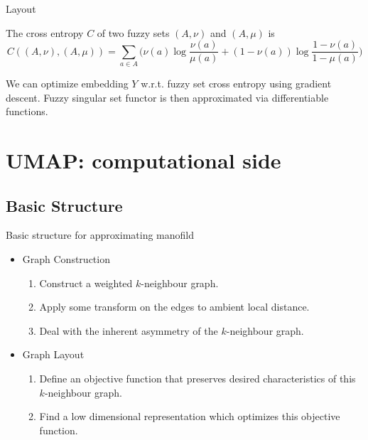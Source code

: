 \documentclass{beamer}
\theoremstyle{named}
\begin{document}
\begin{frame}{Layout}
	\begin{definition}
		The cross entropy $C$ of two fuzzy sets $(A,\nu)$ and $(A, \mu)$ is
		\[
			C((A,\nu), (A, \mu)) = \sum\limits_{a \in A} \big( \nu(a) \log \frac{\nu(a)}{\mu(a)} + (1 - \nu(a)) \log \frac{1 - \nu(a)}{1 - \mu(a)} \big)
		\]
	\end{definition}
We can optimize embedding $Y$ w.r.t. fuzzy set cross entropy using gradient descent. Fuzzy singular set functor is then approximated via differentiable functions.
\end{frame}

\iffalse
\begin{frame}{Layout}
	So the algorithm is next:
	\begin{enumerate}
		\item Construct fuzzy simplicial set
		\item Optimize the layout of data in low dim. space minimizing the error between topological representations
	\end{enumerate}
\end{frame}
\fi

\section{UMAP: computational side}

\subsection{Basic Structure}
\begin{frame}{Basic structure for approximating manofild}
	\begin{itemize}
		\item Graph Construction
		\begin{enumerate}
			\item Construct a weighted $k$-neighbour graph.
			\item Apply some transform on the edges to ambient local distance.
			\item Deal with the inherent asymmetry of the $k$-neighbour graph.
		\end{enumerate}
		\item Graph Layout
		\begin{enumerate}
			\item Define an objective function that preserves desired characteristics of this $k$-neighbour graph.
			\item Find a low dimensional representation which optimizes this objective function.
		\end{enumerate}
	\end{itemize}
\end{frame}
\end{document}
